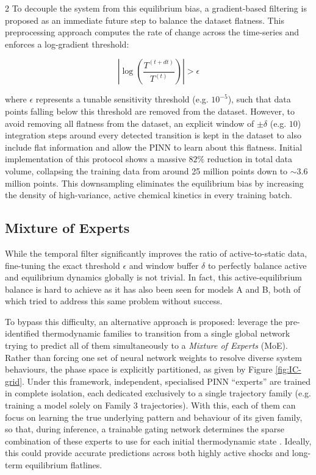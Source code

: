 \documentclass[10pt,a4paper]{article}
\begin{document}
\begin{multicols}{2}
To decouple the system from this equilibrium bias, a gradient-based filtering is proposed as an immediate future step to balance the dataset flatness. This preprocessing approach computes the rate of change across the time-series and enforces a log-gradient threshold:

\[
\left|\log\left(\frac{T^{(t+dt)}}{T^{(t)}}\right) \right| > \epsilon
\]

where $\epsilon$ represents a tunable sensitivity threshold (e.g. $10^{-5}$), such that data points falling below this threshold are removed from the dataset. However, to avoid removing all flatness from the dataset, an explicit window of $\pm \delta$ (e.g. $10$) integration steps around every detected transition is kept in the dataset to also include flat information and allow the PINN to learn about this flatness. Initial implementation of this protocol shows a massive $82\%$ reduction in total data volume, collapsing the training data from around 25 million points down to $\sim$3.6 million points. This downsampling eliminates the equilibrium bias by increasing the density of high-variance, active chemical kinetics in every training batch.

\subsection{Mixture of Experts}

While the temporal filter significantly improves the ratio of active-to-static data, fine-tuning the exact threshold $\epsilon$ and window buffer $\delta$ to perfectly balance active and equilibrium dynamics globally is not trivial. In fact, this active-equilibrium balance is hard to achieve as it has also been seen for models A and B, both of which tried to address this same problem without success.

To bypass this difficulty, an alternative approach is proposed: leverage the pre-identified thermodynamic families to transition from a single global network trying to predict all of them simultaneously to a \textit{Mixture of Experts} (MoE). Rather than forcing one set of neural network weights to resolve diverse system behaviours, the phase space is explicitly partitioned, as given by Figure \ref{fig:IC-grid}. Under this framework, independent, specialised PINN ``experts'' are trained in complete isolation, each dedicated exclusively to a single trajectory family (e.g. training a model solely on Family 3 trajectories). With this, each of them can focus on learning the true underlying pattern and behaviour of its given family, so that, during inference, a trainable gating network determines the sparse combination of these experts to use for each initial thermodynamic state \cite{shazeer2017outrageously}. Ideally, this could provide accurate predictions across both highly active shocks and long-term equilibrium flatlines.


\end{multicols}
\end{document}
